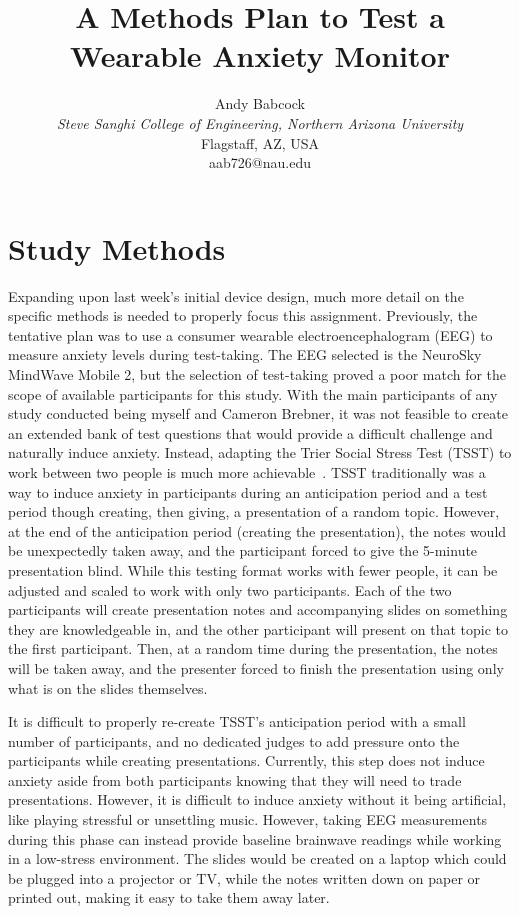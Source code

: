 \documentclass[journal]{IEEEtran}
\begin{document}
\title{A Methods Plan to Test a Wearable Anxiety Monitor}

\author{Andy Babcock \\
    \textit{Steve Sanghi College of Engineering, Northern Arizona University} \\
    Flagstaff, AZ, USA \\
    aab726@nau.edu
}

\maketitle
\section{Study Methods}
Expanding upon last week's initial device design, much more detail on the specific methods is needed to properly focus this assignment. Previously, the tentative plan was to use a consumer wearable electroencephalogram (EEG) to measure anxiety levels during test-taking. The EEG selected is the NeuroSky MindWave Mobile 2, but the selection of test-taking proved a poor match for the scope of available participants for this study. With the main participants of any study conducted being myself and Cameron Brebner, it was not feasible to create an extended bank of test questions that would provide a difficult challenge and naturally induce anxiety. Instead, adapting the Trier Social Stress Test (TSST) to work between two people is much more achievable~\cite{kirschbaum_pirke_hellhammer_1993}. TSST traditionally was a way to induce anxiety in participants during an anticipation period and a test period though creating, then giving, a presentation of a random topic. However, at the end of the anticipation period (creating the presentation), the notes would be unexpectedly taken away, and the participant forced to give the 5-minute presentation blind. While this testing format works with fewer people, it can be adjusted and scaled to work with only two participants. Each of the two participants will create presentation notes and accompanying slides on something they are knowledgeable in, and the other participant will present on that topic to the first participant. Then, at a random time during the presentation, the notes will be taken away, and the presenter forced to finish the presentation using only what is on the slides themselves.

It is difficult to properly re-create TSST's anticipation period with a small number of participants, and no dedicated judges to add pressure onto the participants while creating presentations. Currently, this step does not induce anxiety aside from both participants knowing that they will need to trade presentations. However, it is difficult to induce anxiety without it being artificial, like playing stressful or unsettling music. However, taking EEG measurements during this phase can instead provide baseline brainwave readings while working in a low-stress environment. The slides would be created on a laptop which could be plugged into a projector or TV, while the notes written down on paper or printed out, making it easy to take them away later.
\end{document}
